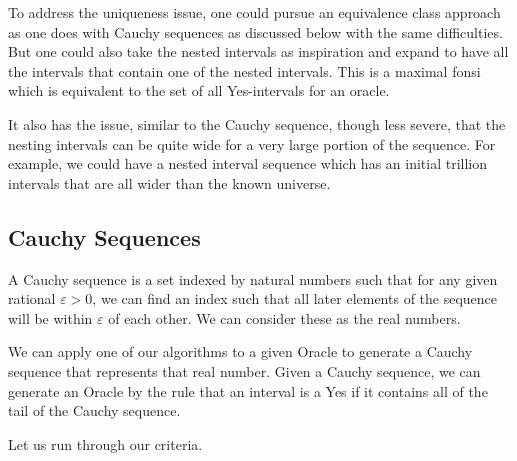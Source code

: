 \documentclass[12pt]{article}
\theoremstyle{remark}
\begin{document}
To address the uniqueness issue, one could pursue an equivalence class approach as one does with Cauchy sequences as discussed below with the same difficulties. But one could also take the nested intervals as inspiration and expand to have all the intervals that contain one of the nested intervals. This is a maximal fonsi which is equivalent to the set of all Yes-intervals for an oracle. 

It also has the issue, similar to the Cauchy sequence, though less severe, that the nesting intervals can be quite wide for a very large portion of the sequence.  For example, we could have a nested interval sequence which has an initial trillion intervals that are all wider than the known universe. 


\subsection{Cauchy Sequences}

A Cauchy sequence is a set indexed by natural numbers such that for any given rational $\varepsilon > 0$, we can find an index such that all later elements of the sequence will be within $\varepsilon$ of each other. We can consider these as the real numbers. 

We can apply one of our algorithms to a given Oracle to generate a Cauchy sequence that represents that real number. Given a Cauchy sequence, we can generate an Oracle by the rule that an interval is a Yes if it contains all of the tail of the Cauchy sequence. 

Let us run through our criteria. 
\end{document}
